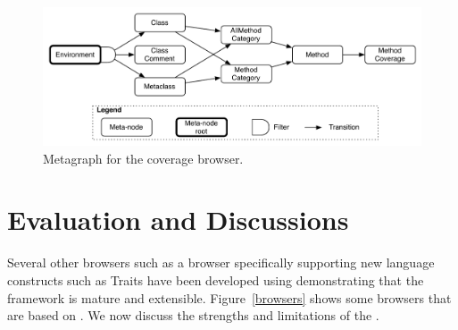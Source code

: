 \documentclass[a4paper,10pt,twoside]{book}
\begin{document}
\begin{figure}[!ht]
\begin{center}
\includegraphics[scale=0.45]{cb-graph.pdf}
\caption{Metagraph for the coverage browser.} 
\end{center}
\end{figure}





\section{Evaluation and Discussions} 

Several other browsers such as a browser specifically supporting new language constructs such as Traits have been developed using \obf demonstrating that the framework is mature and extensible. Figure~\ref{browsers} shows some browsers that are based on \obf.
 We now discuss the strengths and limitations of the \obf.
\end{document}
